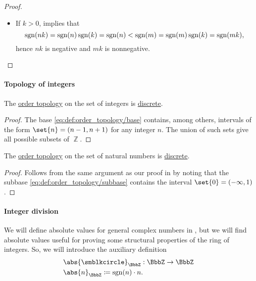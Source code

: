 \begin{proof}
\begin{itemize}
\begin{itemize}
        \item If \( k > 0 \),  implies that
        \begin{equation*}
          \operatorname{sgn}(nk) = \operatorname{sgn}(n) \operatorname{sgn}(k) = \operatorname{sgn}(n) < \operatorname{sgn}(m) = \operatorname{sgn}(m) \operatorname{sgn}(k) = \operatorname{sgn}(mk),
        \end{equation*}
        hence \( nk \) is negative and \( mk \) is nonnegative.
    \end{itemize}
  \end{itemize}
\end{proof}

\paragraph{Topology of integers}

\begin{proposition}\label{thm:order_topology_on_integers_is_discrete}
  The \hyperref[def:order_topology]{order topology} on the set of integers is \hyperref[def:discrete_topology]{discrete}.
\end{proposition}
\begin{proof}
  The base \eqref{eq:def:order_topology/base} contains, among others, intervals of the form \( \set{ n } = (n - 1, n + 1) \) for any integer \( n \). The union of such sets give all possible subsets of \( \BbbZ \).
\end{proof}

\begin{corollary}\label{thm:order_topology_on_natural_numbers_is_discrete}
  The \hyperref[def:order_topology]{order topology} on the set of natural numbers is \hyperref[def:discrete_topology]{discrete}.
\end{corollary}
\begin{proof}
  Follows from the same argument as our proof in  by noting that the subbase \eqref{eq:def:order_topology/subbase} contains the interval \( \set{ 0 } = (-\infty, 1) \).
\end{proof}

\paragraph{Integer division}

\begin{definition}\label{def:integer_absolute_value}\mimprovised
  We will define absolute values for general complex numbers in , but we will find absolute values useful for proving some structural properties of the ring of integers. So, we will introduce the auxiliary definition
  \begin{equation*}
    \begin{aligned}
      &\abs{\anon}_\BbbZ: \BbbZ \to \BbbZ \\
      &\abs{n}_\BbbZ \coloneqq \sgn(n) \cdot n.
    \end{aligned}
  \end{equation*}
\end{definition}

